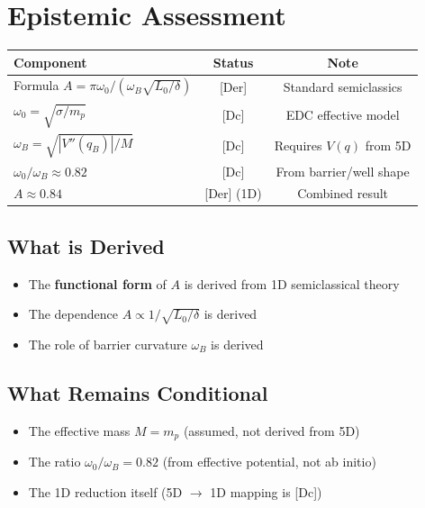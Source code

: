 \documentclass[11pt]{article}
\newcommand{\tagDer}{{\small\textsf{[Der]}}}
\newcommand{\tagDc}{{\small\textsf{[Dc]}}}
\begin{document}
\section{Epistemic Assessment}

\begin{center}
\begin{tabular}{lcc}
\toprule
\textbf{Component} & \textbf{Status} & \textbf{Note} \\
\midrule
Formula $A = \pi\omega_0/(\omega_B\sqrt{L_0/\delta})$ & \tagDer{} & Standard semiclassics \\
$\omega_0 = \sqrt{\sigma/m_p}$ & \tagDc{} & EDC effective model \\
$\omega_B = \sqrt{|V''(q_B)|/M}$ & \tagDc{} & Requires $V(q)$ from 5D \\
$\omega_0/\omega_B \approx 0.82$ & \tagDc{} & From barrier/well shape \\
$A \approx 0.84$ & \tagDer{} (1D) & Combined result \\
\bottomrule
\end{tabular}
\end{center}

\subsection{What is Derived}

\begin{itemize}
    \item The \textbf{functional form} of $A$ is derived from 1D semiclassical theory
    \item The dependence $A \propto 1/\sqrt{L_0/\delta}$ is derived
    \item The role of barrier curvature $\omega_B$ is derived
\end{itemize}

\subsection{What Remains Conditional}

\begin{itemize}
    \item The effective mass $M = m_p$ (assumed, not derived from 5D)
    \item The ratio $\omega_0/\omega_B = 0.82$ (from effective potential, not ab initio)
    \item The 1D reduction itself (5D $\to$ 1D mapping is \tagDc{})
\end{itemize}
\end{document}
